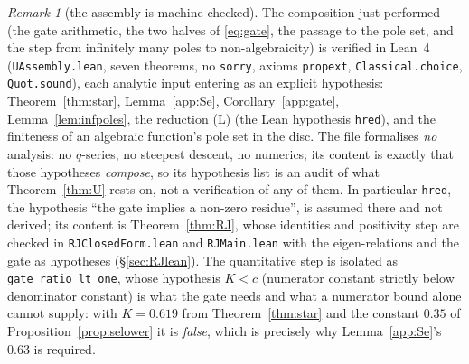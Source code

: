 \documentclass[11pt]{article}
\theoremstyle{plain}
\theoremstyle{definition}
\theoremstyle{remark}
\newtheorem{remark}[theorem]{Remark}
\begin{document}
\begin{remark}[the assembly is machine-checked]\label{rem:uassembly}
The composition just performed (the gate arithmetic, the two halves of \eqref{eq:gate}, the
passage to the pole set, and the step from infinitely many poles to non-algebraicity) is
verified in Lean~4 (\texttt{UAssembly.lean}, seven theorems, no \texttt{sorry}, axioms
\texttt{propext}, \texttt{Classical.choice}, \texttt{Quot.sound}), each analytic input entering as
an explicit hypothesis: Theorem~\ref{thm:star}, Lemma~\ref{app:Se}, Corollary~\ref{app:gate},
Lemma~\ref{lem:infpoles}, the reduction \textup{(L)} (the Lean hypothesis \texttt{hred}), and the
finiteness of an algebraic function's
pole set in the disc. The file formalises \emph{no} analysis: no $q$-series, no steepest
descent, no numerics; its content is exactly that those hypotheses \emph{compose}, so its
hypothesis list is an audit of what Theorem~\ref{thm:U} rests on, not a verification of any of
them. In particular \texttt{hred}, the hypothesis ``the gate implies a non-zero residue'', is
assumed there and not derived; its content is Theorem~\ref{thm:RJ}, whose identities and
positivity step are checked in \texttt{RJClosedForm.lean} and \texttt{RJMain.lean} with the
eigen-relations and the gate as hypotheses (\S\ref{sec:RJlean}). The
quantitative step is isolated
as \texttt{gate\_ratio\_lt\_one}, whose hypothesis $K<c$ (numerator constant strictly below
denominator constant) is what the gate needs and what a numerator bound alone cannot supply:
with $K=0.619$ from Theorem~\ref{thm:star} and the constant $0.35$ of
Proposition~\ref{prop:selower} it is \emph{false}, which is precisely why Lemma~\ref{app:Se}'s
$0.63$ is required.
\end{remark}
\end{document}
